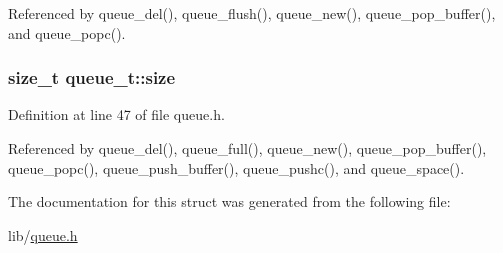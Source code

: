Referenced by queue\+\_\+del(), queue\+\_\+flush(), queue\+\_\+new(), queue\+\_\+pop\+\_\+buffer(), and queue\+\_\+popc().

\subsubsection[{\texorpdfstring{size}{size}}]{\setlength{\rightskip}{0pt plus 5cm}size\+\_\+t queue\+\_\+t\+::size}\hypertarget{structqueue__t_a83a13b888f9d4ef127d706559818b779}{}\label{structqueue__t_a83a13b888f9d4ef127d706559818b779}


Definition at line 47 of file queue.\+h.



Referenced by queue\+\_\+del(), queue\+\_\+full(), queue\+\_\+new(), queue\+\_\+pop\+\_\+buffer(), queue\+\_\+popc(), queue\+\_\+push\+\_\+buffer(), queue\+\_\+pushc(), and queue\+\_\+space().



The documentation for this struct was generated from the following file\+:\begin{DoxyCompactItemize}
\item 
lib/\hyperlink{queue_8h}{queue.\+h}\end{DoxyCompactItemize}
